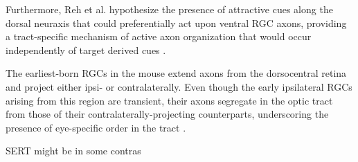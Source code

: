Furthermore, Reh et al. hypothesize the presence of attractive cues along the dorsal neuraxis that could preferentially act upon ventral RGC axons, providing a tract-specific mechanism of active axon organization that would occur independently of target derived cues \cite{reh1983organization}.


The earliest-born RGCs in the mouse extend axons from the dorsocentral retina and project either ipsi- or contralaterally.
Even though the early ipsilateral RGCs arising from this region are transient, their axons segregate in the optic tract from those of their contralaterally-projecting counterparts, underscoring the presence of eye-specific order in the tract \cite{soares2015transient}.

SERT might be in some contras


